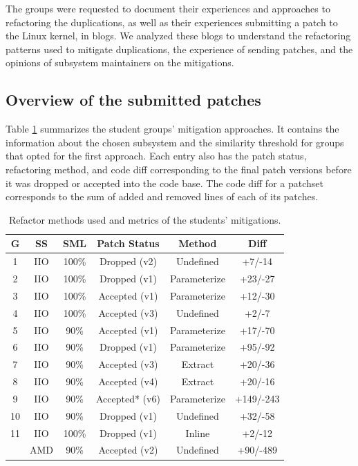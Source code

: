 \documentclass[10pt,conference]{IEEEtran}
\begin{document}
The groups were requested to document their experiences and approaches to refactoring the duplications, as well as their experiences submitting a patch to the Linux kernel, in blogs. We analyzed these blogs to understand the refactoring patterns used to mitigate duplications, the experience of sending patches, and the opinions of subsystem maintainers on the mitigations.

\subsection{Overview of the submitted patches}

Table \ref{tab:stu} summarizes the student groups' mitigation approaches. It contains the information about the chosen subsystem and the similarity threshold for groups that opted for the first approach. Each entry also has the patch status, refactoring method, and code diff corresponding to the final patch versions before it was dropped or accepted into the code base. The code diff for a patchset corresponds to the sum of added and removed lines of each of its patches.

\begin{table}
\centering
\caption{Refactor methods used and metrics of the students' mitigations.}
\begin{tabular}{ |c |c |c |c |c | c| }
\hline
\textbf{G} & \textbf{SS} & \textbf{SML} & \textbf{Patch Status} & \textbf{Method} & \textbf{Diff} \\
\hline

1 & IIO & 100\% & Dropped (v2) & Undefined & +7/-14 \\ \hline
2 & IIO & 100\% & Dropped (v1) & Parameterize & +23/-27 \\ \hline
3 & IIO & 100\% & Accepted (v1) & Parameterize & +12/-30 \\ \hline
4 & IIO & 100\% & Accepted (v3) & Undefined & +2/-7 \\ \hline
5 & IIO & 90\% & Accepted (v1) & Parameterize & +17/-70 \\ \hline
6 & IIO & 90\% & Dropped (v1) & Parameterize & +95/-92 \\ \hline
7 & IIO & 90\% & Accepted (v3) & Extract & +20/-36 \\ \hline
8 & IIO & 90\% & Accepted (v4) & Extract & +20/-16 \\ \hline
9 & IIO & 90\% & Accepted* (v6) & Parameterize & +149/-243 \\ \hline
10 & IIO & 90\% & Dropped (v1) & Undefined & +32/-58 \\ \hline
11 & IIO & 100\% & Dropped (v1) & Inline & +2/-12 \\ 
   & AMD & 90\% & Accepted (v2) & Undefined & +90/-489 \\ \hline

\end{tabular}%

\label{tab:stu}
\end{table}
\end{document}
